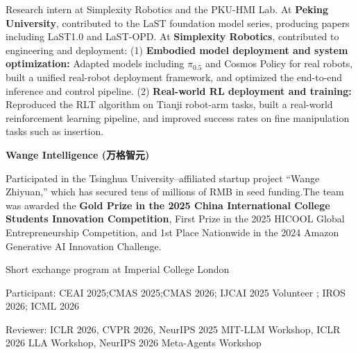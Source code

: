 \documentclass[10pt]{article}
\begin{document}
\experiencegap
{}
Research intern at Simplexity Robotics and the PKU-HMI Lab. At \textbf{Peking University}, contributed to the LaST foundation model series, producing papers including LaST1.0 and LaST-OPD. At \textbf{Simplexity Robotics}, contributed to engineering and deployment: (1) \textbf{Embodied model deployment and system optimization:} Adapted models including $\pi_{0.5}$ and Cosmos Policy for real robots, built a unified real-robot deployment framework, and optimized the end-to-end inference and control pipeline.
(2) \textbf{Real-world RL deployment and training:} Reproduced the RLT algorithm on Tianji robot-arm tasks, built a real-world reinforcement learning pipeline, and improved success rates on fine manipulation tasks such as insertion.
{\color{headinggray}\bfseries Wange Intelligence ({\normalfont\cjk 万格智元})\par}
Participated in the Tsinghua University–affiliated startup project “Wange Zhiyuan,” which has secured tens of millions of RMB in seed funding.The team was awarded the \textbf{Gold Prize in the 2025 China International College Students\textquotesingle{} Innovation Competition}, First Prize in the 2025 HICOOL Global Entrepreneurship Competition, and 1st Place Nationwide in the 2024 Amazon Generative AI Innovation Challenge.

\begin{cvitems}
\item Short exchange program at Imperial College London
\item Participant: CEAI 2025;CMAS 2025;CMAS 2026; IJCAI 2025 Volunteer ; IROS 2026; ICML 2026
\item Reviewer: ICLR 2026, CVPR 2026, NeurIPS 2025 MIT-LLM Workshop, ICLR 2026 LLA Workshop, NeurIPS 2026 Meta-Agents Workshop
\end{cvitems}
\end{document}
